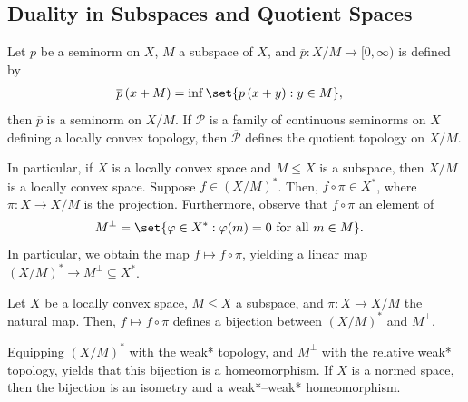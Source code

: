 \documentclass[10pt]{mypackage}
\begin{document}
\subsection{Duality in Subspaces and Quotient Spaces}%
\begin{proposition}
  Let $p$ be a seminorm on $ X $, $M$ a subspace of $X$, and $ \overline{p}\colon X/M\rightarrow [0,\infty) $ is defined by
  \begin{align*}
    \overline{p}\left( x + M \right) &= \inf\set{p\left( x + y \right) : y\in M},
  \end{align*}
  then $ \overline{p} $ is a seminorm on $X/M$. If $ \mathcal{P} $ is a family of continuous seminorms on $X$ defining a locally convex topology, then $ \overline{ \mathcal{P} } $ defines the quotient topology on $X/M$.
\end{proposition}
In particular, if $X$ is a locally convex space and $M\leq X$ is a subspace, then $X/M$ is a locally convex space. Suppose $f\in \left( X/M \right)^{\ast}$. Then, $f\circ \pi\in X^{\ast}$, where $\pi\colon X\rightarrow X/M$ is the projection. Furthermore, observe that $f\circ \pi$ an element of
\begin{align*}
  M^{\perp} &= \set{\varphi\in X^{\ast} : \varphi(m) = 0\text{ for all }m\in M}.
\end{align*}
In particular, we obtain the map $f\mapsto f\circ\pi$, yielding a linear map $\left( X/M \right)^{\ast}\rightarrow M^{\perp}\subseteq X^{\ast}$.
\begin{theorem}
  Let $X$ be a locally convex space, $M\leq X$ a subspace, and $\pi\colon X\rightarrow X/M$ the natural map. Then, $f\mapsto f\circ \pi$ defines a bijection between $\left( X/M \right)^{\ast}$ and $M^{\perp}$.

  Equipping $\left( X/M \right)^{\ast}$ with the weak* topology, and $M^{\perp}$ with the relative weak* topology, yields that this bijection is a homeomorphism. If $X$ is a normed space, then the bijection is an isometry and a weak*--weak* homeomorphism.
\end{theorem}
\end{document}
